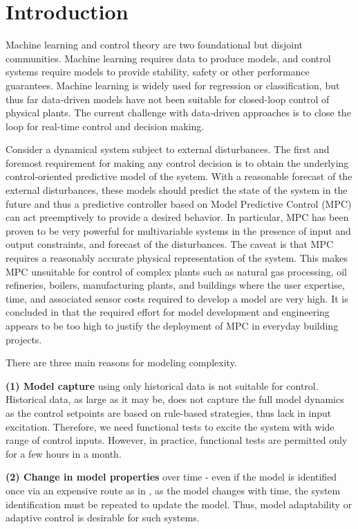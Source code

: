 \section{Introduction}

Machine learning and control theory are two foundational but disjoint communities.
Machine learning requires data to produce models, and control systems require models to provide stability, safety or other performance guarantees.
Machine learning is widely used for regression or classification, but thus far data-driven models have not been suitable for closed-loop control of physical plants.
The current challenge with data-driven approaches is to close the loop for real-time control and decision making.

Consider a dynamical system subject to external disturbances.
The first and foremost requirement for making any control decision is to obtain the underlying control-oriented predictive model of the system.
With a reasonable forecast of the external disturbances, these models should predict the state of the system in the future and thus a predictive controller based on Model Predictive Control (MPC) can act preemptively to provide a desired behavior.
In particular, MPC has been proven to be very powerful for multivariable systems in the presence of input and output constraints, and forecast of the disturbances.
The caveat is that MPC requires a reasonably accurate physical representation of the system.
This makes MPC unsuitable for control of complex plants such as natural gas processing, oil refineries, boilers, manufacturing plants, and buildings where the user expertise, time, and associated sensor costs required to develop a model are very high.
It is concluded in \cite{Sturzenegger2016} that the required effort for model development and engineering appears to be too high to justify the deployment of MPC in everyday building projects.

There are three main reasons for modeling complexity. 

\noindent \textbf{(1) Model capture} using only historical data is not suitable for control. Historical data, as large as it may be, does not capture the full model dynamics as the control setpoints are based on rule-based strategies, thus lack in input excitation. Therefore, we need functional tests to excite the system with wide range of control inputs. However, in practice, functional tests are permitted only for a few hours in a month.

\noindent \textbf{(2) Change in model properties} over time - even if the model is identified once via an expensive route as in  \cite{Sturzenegger2016}, as the model changes with time, the system identification must be repeated to update the model. Thus, model adaptability or adaptive control is desirable for such systems. 

